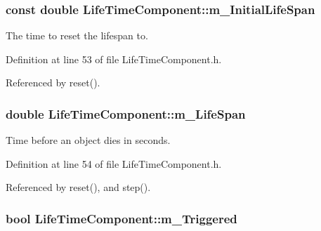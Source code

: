 \subsubsection[{\texorpdfstring{m\+\_\+\+Initial\+Life\+Span}{m_InitialLifeSpan}}]{\setlength{\rightskip}{0pt plus 5cm}const double Life\+Time\+Component\+::m\+\_\+\+Initial\+Life\+Span\hspace{0.3cm}{\ttfamily [private]}}\hypertarget{class_life_time_component_adb6e05948b0edd9b4237861f064c9beb}{}\label{class_life_time_component_adb6e05948b0edd9b4237861f064c9beb}


The time to reset the lifespan to. 



Definition at line 53 of file Life\+Time\+Component.\+h.



Referenced by reset().

\subsubsection[{\texorpdfstring{m\+\_\+\+Life\+Span}{m_LifeSpan}}]{\setlength{\rightskip}{0pt plus 5cm}double Life\+Time\+Component\+::m\+\_\+\+Life\+Span\hspace{0.3cm}{\ttfamily [private]}}\hypertarget{class_life_time_component_a7a6b268136bb72e6b3d492d110681969}{}\label{class_life_time_component_a7a6b268136bb72e6b3d492d110681969}


Time before an object dies in seconds. 



Definition at line 54 of file Life\+Time\+Component.\+h.



Referenced by reset(), and step().

\subsubsection[{\texorpdfstring{m\+\_\+\+Triggered}{m_Triggered}}]{\setlength{\rightskip}{0pt plus 5cm}bool Life\+Time\+Component\+::m\+\_\+\+Triggered\hspace{0.3cm}{\ttfamily [private]}}\hypertarget{class_life_time_component_a9d1b78e698610ab263f788e29474b3bd}{}\label{class_life_time_component_a9d1b78e698610ab263f788e29474b3bd}


